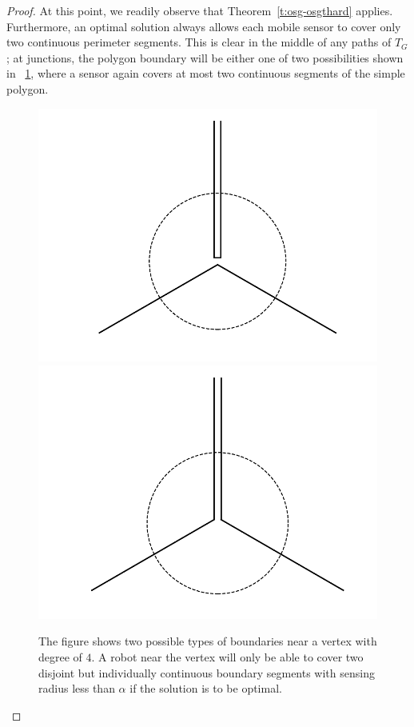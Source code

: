\begin{proof}
At this point, we readily observe that Theorem~\ref{t:osg-osgthard} applies. 
Furthermore, an optimal solution always allows each mobile sensor to 
cover only two continuous perimeter segments. This is clear in the middle 
of any paths of $T_G$; at junctions, the polygon boundary will be either 
one of two possibilities shown in ~\ref{fig:osg-2types}, where a sensor
again covers at most two continuous segments of the simple polygon. 
\begin{figure}[!ht]
    \centering
    \includegraphics[scale=.29]{chapters/osg/figures/t1-eps-converted-to.pdf}
    \includegraphics[scale=.29]{chapters/osg/figures/t2-eps-converted-to.pdf}
    \caption[Two possible types of boundaries]{The figure shows two possible types of boundaries near a 
		vertex with degree of $4$. A robot near the vertex will only be able 
		to cover two disjoint but individually continuous boundary segments 
		with sensing radius less than $\alpha$ if the solution is to be optimal.}
    \label{fig:osg-2types}
\end{figure}
\end{proof}
